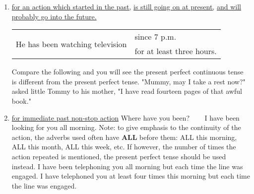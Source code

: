 \begin{enumerate}
    \item \underline{for an action which started in the past,}
        \newline
        \underline{is still going on at present,}
        \newline
        \underline{and will probably go into the future.}
        \newline
        \newline
        \begin{tabular}{ll}
            \multirow{2}{*}{He has been watching television}
            & since 7 p.m. \\
            & for at least three hours.
        \end{tabular}
        \newline
        \newline
        Compare the following and you will see the present perfect continuous
        tense is different from the present perfect tense.
        \newline
        \newline
        "Mummy, may I take a rest now?" asked little Tommy to his mother,
        "I have read fourteen pages of that awful book."
    \item \underline{for immediate past non-stop action}
        \newline
        \newline
        Where have you been? ~~~ I have been looking for you all morning.
        \newline
        \newline
        Note: to give emphasis to the continuity of the action, the adverbs used
        often have \textbf{ALL} before them:
        \newline
        \newline
        ALL this morning, ALL this month, ALL this week, etc.
        If however, the number of times the action repeated is mentioned,
        the present perfect tense should be used instead.
        \newline
        \newline
        I have been telephoning you all morning but each time the line was engaged.
        \newline
        \newline
        I have telephoned you at least four times this morning but each time the line was engaged.
\end{enumerate}
